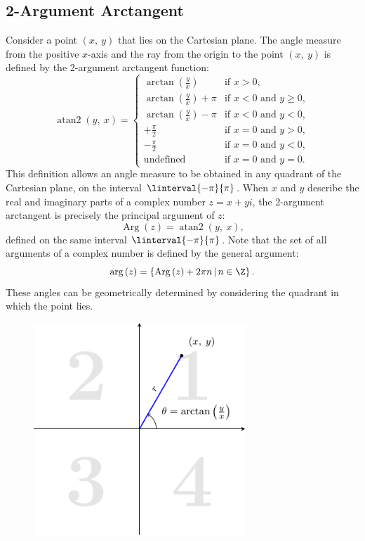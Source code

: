 \documentclass{article}
\begin{document}
\subsection{2-Argument Arctangent}
Consider a point \(\left( x,\: y \right)\) that lies on the Cartesian
plane. The angle measure from the positive \(x\)-axis and the ray from
the origin to the point \(\left( x,\: y \right)\) is defined by the
2-argument arctangent function:
\begin{equation*}
    \operatorname{atan2}\left( y,\: x \right) =
    \begin{cases}
        \arctan{\left( \frac{y}{x} \right)}       & \text{if \(x > 0\)},                       \\
        \arctan{\left( \frac{y}{x} \right)} + \pi & \text{if \(x < 0\) and \(y \geqslant 0\)}, \\
        \arctan{\left( \frac{y}{x} \right)} - \pi & \text{if \(x < 0\) and \(y < 0\)},         \\
        +\frac{\pi}{2}                            & \text{if \(x = 0\) and \(y > 0\)},         \\
        -\frac{\pi}{2}                            & \text{if \(x = 0\) and \(y < 0\)},         \\
        \text{undefined}                          & \text{if \(x = 0\) and \(y = 0\)}.
    \end{cases}
\end{equation*}
This definition allows an angle measure to be obtained in any quadrant
of the Cartesian plane, on the interval \(\linterval{-\pi}{\pi}\).
When \(x\) and \(y\) describe the real and imaginary parts of a complex
number \(z = x + yi\), the 2-argument arctangent is precisely the
principal argument of \(z\):
\begin{equation*}
    \operatorname{Arg}\left( z \right) = \operatorname{atan2}\left( y,\: x \right),
\end{equation*}
defined on the same interval \(\linterval{-\pi}{\pi}\).
Note that the set of all arguments of a complex number is defined by the
general argument:
\begin{equation*}
    \arg{\left( z \right)} = \left\{ \operatorname{Arg}\left( z \right) + 2\pi n \,\vert\, n \in \Z \right\}.
\end{equation*}
These angles can be geometrically determined by considering the quadrant
in which the point lies.
\begin{figure}[H]
    \centering
    \includegraphics[width=8cm]{figures/Arg-q1.pdf}
\end{figure}
\end{document}
